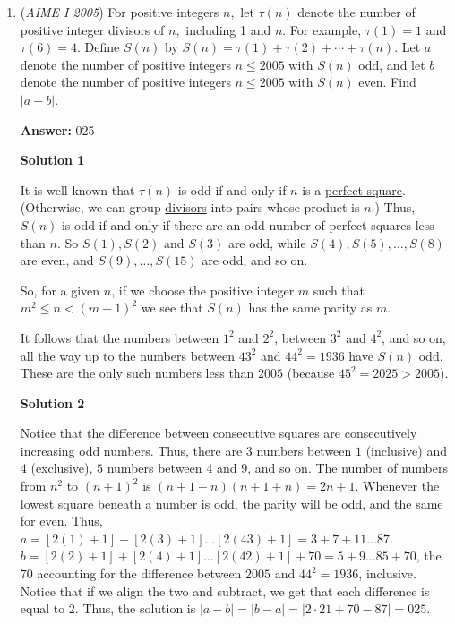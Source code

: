 \begin{enumerate}
 



\textbf{Solution 5}

It is easy after getting the image, after drawing labeling the lengths of those segments, assume the radius is $x$, we can see $x=\sqrt{2}(8-x)$ and we get $2x=32-\sqrt{512}$ and we have the answer $\boxed{544}$ ~bluesoul

 


	\item (\textit{AIME I 2005}) For positive integers $n,$ let $\tau (n)$ denote the number of positive integer divisors of $n,$ including 1 and $n.$ For example, $\tau (1)=1$ and $\tau(6) =4.$ Define $S(n)$ by $S(n)=\tau(1)+ \tau(2) + \cdots + \tau(n).$ Let $a$ denote the number of positive integers $n \leq 2005$ with $S(n)$ odd, and let $b$ denote the number of positive integers $n \leq 2005$ with $S(n)$ even. Find $|a-b|.$

 \textbf{Answer: }025



\textbf{Solution 1}

It is well-known that $\tau(n)$ is odd if and only if $n$ is a \href{https://artofproblemsolving.com/wiki/index.php?title=Perfect\_square}{perfect square}.  (Otherwise, we can group \href{https://artofproblemsolving.com/wiki/index.php?title=Divisor}{divisors} into pairs whose product is $n$.)  Thus, $S(n)$ is odd if and only if there are an odd number of perfect squares less than $n$.  So $S(1), S(2)$ and $S(3)$ are odd, while $S(4), S(5), \ldots, S(8)$ are even, and $S(9), \ldots, S(15)$ are odd, and so on. 

 So, for a given $n$, if we choose the positive integer $m$ such that $m^2 \leq n < (m + 1)^2$ we see that $S(n)$ has the same parity as $m$.  

 It follows that the numbers between $1^2$ and $2^2$, between $3^2$ and $4^2$, and so on, all the way up to the numbers between $43^2$ and $44^2 = 1936$ have $S(n)$ odd. These are the only such numbers less than $2005$ (because $45^2 = 2025 > 2005$).

 



\textbf{Solution 2}

Notice that the difference between consecutive squares are consecutively increasing odd numbers. Thus, there are $3$ numbers between $1$ (inclusive) and $4$ (exclusive), $5$ numbers between $4$ and $9$, and so on. The number of numbers from $n^2$ to $(n + 1)^2$ is $(n + 1 - n)(n + 1 + n) = 2n + 1$. Whenever the lowest square beneath a number is odd, the parity will be odd, and the same for even. Thus, $a = [2(1) + 1] + [2(3) + 1] \ldots [2(43) + 1] = 3 + 7 + 11 \ldots 87$. $b = [2(2) + 1] + [2(4) + 1] \ldots [2(42) + 1] + 70 = 5 + 9 \ldots 85 + 70$, the $70$ accounting for the difference between $2005$ and $44^2 = 1936$, inclusive. Notice that if we align the two and subtract, we get that each difference is equal to $2$. Thus, the solution is $|a - b| = |b - a| = |2 \cdot 21 + 70 - 87| = \boxed{025}$.


\end{enumerate}
